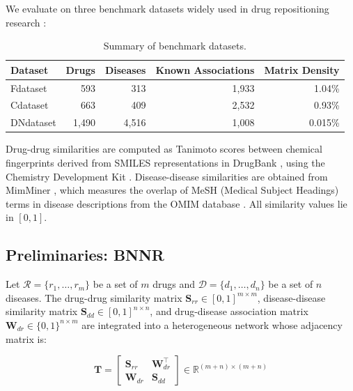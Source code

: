 \documentclass[unnumsec,webpdf,contemporary,large]{oup-authoring-template}
\begin{document}
We evaluate on three benchmark datasets widely used in drug repositioning research \citep{gottlieb2011,luo2016,martinez2015,yang2019}:

\begin{table}[t]
\centering
\caption{Summary of benchmark datasets.}
\label{tab:datasets}
\begin{tabular}{lrrrr}
\toprule
Dataset & Drugs & Diseases & Known Associations & Matrix Density \\
\midrule
Fdataset  &   593 &   313 & 1,933 & 1.04\%   \\
Cdataset  &   663 &   409 & 2,532 & 0.93\%   \\
DNdataset & 1,490 & 4,516 & 1,008 & 0.015\%  \\
\bottomrule
\end{tabular}
\end{table}

Drug-drug similarities are computed as Tanimoto scores between chemical fingerprints derived from SMILES representations in DrugBank \citep{wishart2006}, using the Chemistry Development Kit \citep{steinbeck2003}. Disease-disease similarities are obtained from MimMiner \citep{vandriel2006}, which measures the overlap of MeSH (Medical Subject Headings) terms in disease descriptions from the OMIM database \citep{hamosh2002}. All similarity values lie in $[0, 1]$.

\subsection{Preliminaries: BNNR \citep{yang2019}}
\label{sec:prelim_bnnr}

Let $\mathcal{R} = \{r_1, \ldots, r_m\}$ be a set of $m$ drugs and $\mathcal{D} = \{d_1, \ldots, d_n\}$ be a set of $n$ diseases. The drug-drug similarity matrix $\mathbf{S}_{rr} \in [0,1]^{m \times m}$, disease-disease similarity matrix $\mathbf{S}_{dd} \in [0,1]^{n \times n}$, and drug-disease association matrix $\mathbf{W}_{dr} \in \{0,1\}^{n \times m}$ are integrated into a heterogeneous network whose adjacency matrix is:

\begin{equation}
\mathbf{T} = \begin{bmatrix}
\mathbf{S}_{rr} & \mathbf{W}_{dr}^\top \\
\mathbf{W}_{dr} & \mathbf{S}_{dd}
\end{bmatrix} \in \mathbb{R}^{(m+n) \times (m+n)}
\label{eq:T}
\end{equation}
\end{document}
